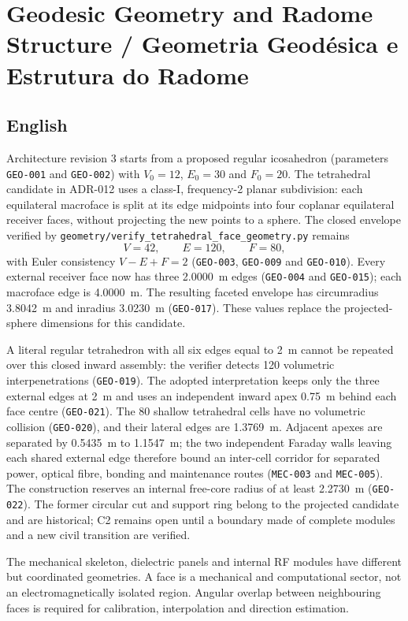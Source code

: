 \chapter{Geodesic Geometry and Radome Structure / Geometria Geodésica e Estrutura do Radome}

\section*{English}
Architecture revision 3 starts from a proposed regular icosahedron (parameters \texttt{GEO-001} and \texttt{GEO-002}) with $V_0=12$, $E_0=30$ and $F_0=20$. The tetrahedral candidate in ADR-012 uses a class-I, frequency-2 planar subdivision: each equilateral macroface is split at its edge midpoints into four coplanar equilateral receiver faces, without projecting the new points to a sphere. The closed envelope verified by \texttt{geometry/verify\_tetrahedral\_face\_geometry.py} remains
\[
V=42,\qquad E=120,\qquad F=80,
\]
with Euler consistency $V-E+F=2$ (\texttt{GEO-003}, \texttt{GEO-009} and \texttt{GEO-010}). Every external receiver face now has three \SI{2.0000}{m} edges (\texttt{GEO-004} and \texttt{GEO-015}); each macroface edge is \SI{4.0000}{m}. The resulting faceted envelope has circumradius \SI{3.8042}{m} and inradius \SI{3.0230}{m} (\texttt{GEO-017}). These values replace the projected-sphere dimensions for this candidate.

A literal regular tetrahedron with all six edges equal to \SI{2}{m} cannot be repeated over this closed inward assembly: the verifier detects 120 volumetric interpenetrations (\texttt{GEO-019}). The adopted interpretation keeps only the three external edges at \SI{2}{m} and uses an independent inward apex \SI{0.75}{m} behind each face centre (\texttt{GEO-021}). The 80 shallow tetrahedral cells have no volumetric collision (\texttt{GEO-020}), and their lateral edges are \SI{1.3769}{m}. Adjacent apexes are separated by \SI{0.5435}{m} to \SI{1.1547}{m}; the two independent Faraday walls leaving each shared external edge therefore bound an inter-cell corridor for separated power, optical fibre, bonding and maintenance routes (\texttt{MEC-003} and \texttt{MEC-005}). The construction reserves an internal free-core radius of at least \SI{2.2730}{m} (\texttt{GEO-022}). The former circular cut and support ring belong to the projected candidate and are historical; C2 remains open until a boundary made of complete modules and a new civil transition are verified.

The mechanical skeleton, dielectric panels and internal RF modules have different but coordinated geometries. A face is a mechanical and computational sector, not an electromagnetically isolated region. Angular overlap between neighbouring faces is required for calibration, interpolation and direction estimation.

